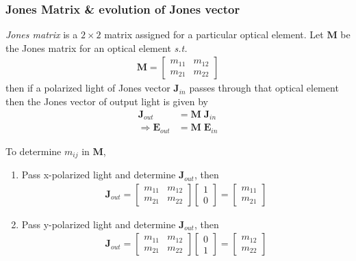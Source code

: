 \documentclass[11pt,a4paper]{article}
\numberwithin{equation}{section}
\begin{document}
\subsubsection{Jones Matrix \& evolution of Jones vector}
\textit{Jones matrix} is a $2\times2$ matrix assigned for a particular optical element. Let $\boldsymbol{M}$ be the Jones matrix for an optical element \textit{s.t.} 
\begin{align*}\boldsymbol{M}=
	\begin{bmatrix}
		m_{11} & m_{12}\\
		m_{21} & m_{22}
	\end{bmatrix}
\end{align*}
then if a polarized light of Jones vector $\boldsymbol{J}_{in}$ passes through that optical element then the Jones vector of output light is given by 
\begin{align}
	\boldsymbol{J}_{out}&=\boldsymbol{M}\;\boldsymbol{J}_{in}\label{eq:1.4}\\	\Rightarrow \boldsymbol{E}_{out}&=\boldsymbol{M}\;\boldsymbol{E}_{in} \label{eq:1.5}
\end{align}

To determine $m_{ij}$ in $\boldsymbol{M}$,
\begin{enumerate}
	\item Pass x-polarized light and determine $\boldsymbol{J}_{out}$, then 
	\begin{align*}
		\boldsymbol{J}_{out}=
		\begin{bmatrix}
			m_{11} & m_{12}\\
			m_{21} & m_{22}
		\end{bmatrix}
		\begin{bmatrix}
			1\\
			0
		\end{bmatrix}=
	\begin{bmatrix}
		m_{11}\\
		m_{21}
	\end{bmatrix}
	\end{align*}

\item Pass y-polarized light and determine $\boldsymbol{J}_{out}$, then 
\begin{align*}
	\boldsymbol{J}_{out}=
	\begin{bmatrix}
		m_{11} & m_{12}\\
		m_{21} & m_{22}
	\end{bmatrix}
	\begin{bmatrix}
		0\\
		1
	\end{bmatrix}=
	\begin{bmatrix}
		m_{12}\\
		m_{22}
	\end{bmatrix}
\end{align*}
\end{enumerate}
\end{document}
